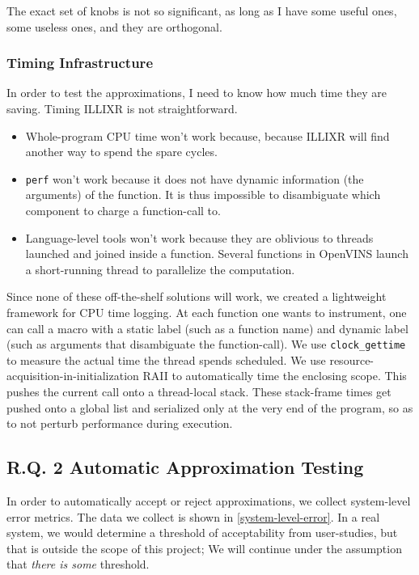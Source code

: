 The exact set of knobs is not so significant, as long as I have some useful ones, some useless ones, and they are orthogonal.

\subsubsection{Timing Infrastructure}

In order to test the approximations, I need to know how much time they are saving. Timing ILLIXR is not straightforward.
\begin{itemize}
\item Whole-program CPU time won't work because, because ILLIXR will find another way to spend the spare cycles.
\item \verb+perf+ won't work because it does not have dynamic information (the arguments) of the function. It is thus impossible to disambiguate which component to charge a function-call to.
\item Language-level tools won't work because they are oblivious to threads launched and joined inside a function. Several functions in OpenVINS launch a short-running thread to parallelize the computation.
\end{itemize}

Since none of these off-the-shelf solutions will work, we created a lightweight framework for CPU time logging. At each function one wants to instrument, one can call a macro with a static label (such as a function name) and dynamic label (such as arguments that disambiguate the function-call). We use \verb+clock_gettime+ to measure the actual time the thread spends scheduled. We use resource-acquisition-in-initialization RAII to automatically time the enclosing scope. This pushes the current call onto a thread-local stack. These stack-frame times get pushed onto a global list and serialized only at the very end of the program, so as to not perturb performance during execution. 

\subsection{R.Q. 2 Automatic Approximation Testing}

In order to automatically accept or reject approximations, we collect system-level error metrics. The data we collect is shown in \cref{system-level-error}. In a real system, we would determine a threshold of acceptability from user-studies, but that is outside the scope of this project; We will continue under the assumption that \textit{there is some} threshold.

